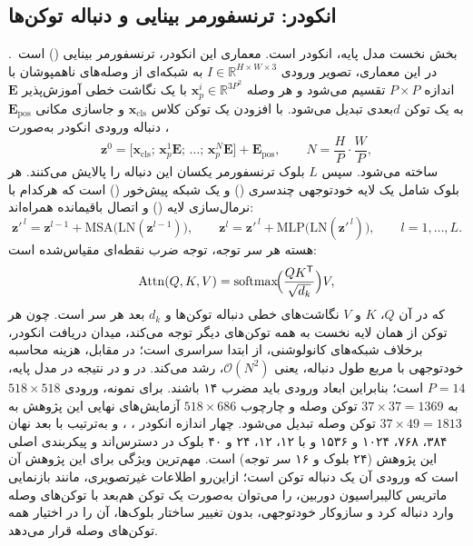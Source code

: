\subsection[انکودر: ترنسفورمر بینایی و دنباله توکن‌ها]{انکودر: ترنسفورمر بینایی و دنباله توکن‌ها}
بخش نخست مدل پایه، انکودر  است. معماری این انکودر، ترنسفورمر بینایی () است~\cite{Dosovitskiy2020ViT}. در این معماری، تصویر ورودی $I\in\mathbb{R}^{H\times W\times3}$ به شبکه‌ای از وصله‌های ناهمپوشان با اندازه $P\times P$ تقسیم می‌شود و هر وصله $\mathbf{x}_p^{i}\in\mathbb{R}^{3P^2}$ با یک نگاشت خطی آموزش‌پذیر $\mathbf{E}$ به یک توکن $d$بعدی تبدیل می‌شود. با افزودن یک توکن کلاس $\mathbf{x}_{\mathrm{cls}}$ و جاسازی مکانی $\mathbf{E}_{\mathrm{pos}}$، دنباله ورودی انکودر به‌صورت
\begin{equation}
 \mathbf{z}^{0}=\bigl[\mathbf{x}_{\mathrm{cls}};\,\mathbf{x}_p^{1}\mathbf{E};\,\dots;\,\mathbf{x}_p^{N}\mathbf{E}\bigr]+\mathbf{E}_{\mathrm{pos}},\qquad N=\frac{H}{P}\cdot\frac{W}{P},
\end{equation}
ساخته می‌شود. سپس $L$ بلوک ترنسفورمر یکسان این دنباله را پالایش می‌کنند. هر بلوک شامل یک لایه خودتوجهی چندسری () و یک شبکه پیش‌خور () است که هرکدام با نرمال‌سازی لایه () و اتصال باقیمانده همراه‌اند:
\begin{equation}
 \mathbf{z}'^{\,l}=\mathbf{z}^{l-1}+\mathrm{MSA}\bigl(\mathrm{LN}(\mathbf{z}^{l-1})\bigr),\qquad
 \mathbf{z}^{l}=\mathbf{z}'^{\,l}+\mathrm{MLP}\bigl(\mathrm{LN}(\mathbf{z}'^{\,l})\bigr),\qquad l=1,\dots,L.
\end{equation}
هسته هر سر توجه، توجه ضرب نقطه‌ای مقیاس‌شده است:
\begin{equation}
 \mathrm{Attn}(Q,K,V)=\mathrm{softmax}\!\Bigl(\frac{QK^{\mathsf T}}{\sqrt{d_k}}\Bigr)V,
\end{equation}
که در آن $Q$، $K$ و $V$ نگاشت‌های خطی دنباله توکن‌ها و $d_k$ بعد هر سر است. چون هر توکن از همان لایه نخست به همه توکن‌های دیگر توجه می‌کند، میدان دریافت انکودر، برخلاف شبکه‌های کانولوشنی، از ابتدا سراسری است؛ در مقابل، هزینه محاسبه خودتوجهی با مربع طول دنباله، یعنی $\mathcal{O}(N^2)$، رشد می‌کند. در  و در نتیجه در مدل پایه، $P=14$ است؛ بنابراین ابعاد ورودی باید مضرب ۱۴ باشند. برای نمونه، ورودی $518\times518$ به $37\times37=1369$ توکن وصله و چارچوب $518\times686$ آزمایش‌های نهایی این پژوهش به $37\times49=1813$ توکن وصله تبدیل می‌شود. چهار اندازه انکودر ، ،  و  به‌ترتیب با بعد نهان ۳۸۴، ۷۶۸، ۱۰۲۴ و ۱۵۳۶ و با ۱۲، ۱۲، ۲۴ و ۴۰ بلوک در دسترس‌اند و پیکربندی اصلی این پژوهش  (۲۴ بلوک و ۱۶ سر توجه) است. مهم‌ترین ویژگی  برای این پژوهش آن است که ورودی آن یک دنباله توکن است؛ ازاین‌رو اطلاعات غیرتصویری، مانند بازنمایی ماتریس کالیبراسیون دوربین، را می‌توان به‌صورت یک توکن هم‌بعد با توکن‌های وصله وارد دنباله کرد و سازوکار خودتوجهی، بدون تغییر ساختار بلوک‌ها، آن را در اختیار همه توکن‌های وصله قرار می‌دهد.

